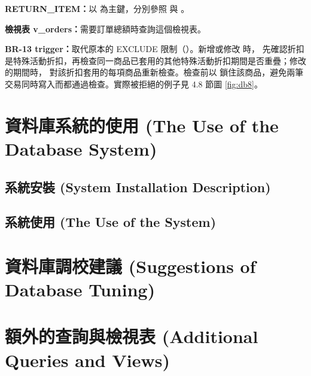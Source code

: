 \textbf{RETURN\_ITEM：}以  為主鍵，分別參照  與 。

\textbf{檢視表 v\_orders：}需要訂單總額時查詢這個檢視表。

\textbf{BR-13 trigger：}取代原本的 EXCLUDE 限制（）。新增或修改  時， 先確認折扣是特殊活動折扣，再檢查同一商品已套用的其他特殊活動折扣期間是否重疊；修改  的期間時， 對該折扣套用的每項商品重新檢查。檢查前以  鎖住該商品，避免兩筆交易同時寫入而都通過檢查。實際被拒絕的例子見 4.8 節圖 \ref{fig:db8}。

\clearpage
\section{資料庫系統的使用 (The Use of the Database System)}

\subsection{系統安裝 (System Installation Description)}



\subsection{系統使用 (The Use of the System)}



\clearpage
\section{資料庫調校建議 (Suggestions of Database Tuning)}



\clearpage
\section{額外的查詢與檢視表 (Additional Queries and Views)}

